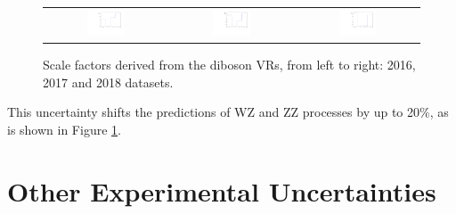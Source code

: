 \begin{figure}[tbh!]
 \begin{center}
 \begin{tabular}{ccc}
  \includegraphics[width=0.325\textwidth]{figures/Part3/Systematics/2016_VV_Sys_1D}&
    \includegraphics[width=0.325\textwidth]{figures/Part3/Systematics/2017_VV_Sys_1D}&
  \includegraphics[width=0.325\textwidth]{figures/Part3/Systematics/2018_VV_Sys_1D}\\
 \end{tabular}
 \caption{Scale factors derived from the diboson \acp{VR}, from left to right: 2016, 2017 and 2018 datasets.}
 \label{fig:SF_VV}
 \end{center}
\end{figure}

This uncertainty shifts the predictions of WZ and ZZ processes by up to 20$\%$, as is shown in Figure \ref{fig:SF_VV}.

\section{Other Experimental Uncertainties}
\label{sec:OthUnc}

